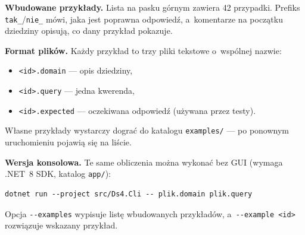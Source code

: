\documentclass[11pt,a4paper]{article}
\begin{document}
\textbf{Wbudowane przykłady.} Lista na pasku górnym zawiera 42 przypadki.
Prefiks \texttt{tak\_}/\texttt{nie\_} mówi, jaka jest poprawna odpowiedź,
a~komentarze na początku dziedziny opisują, co dany przykład pokazuje.

\textbf{Format plików.} Każdy przykład to trzy pliki tekstowe o~wspólnej
nazwie:
\begin{itemize}
  \item \texttt{<id>.domain} --- opis dziedziny,
  \item \texttt{<id>.query} --- jedna kwerenda,
  \item \texttt{<id>.expected} --- oczekiwana odpowiedź (używana przez testy).
\end{itemize}
Własne przykłady wystarczy dograć do katalogu \texttt{examples/} ---
po ponownym uruchomieniu pojawią się na liście.

\textbf{Wersja konsolowa.} Te same obliczenia można wykonać bez GUI
(wymaga .NET~8 SDK, katalog \texttt{app/}):
\begin{verbatim}
dotnet run --project src/Ds4.Cli -- plik.domain plik.query
\end{verbatim}
Opcja \texttt{-{}-examples} wypisuje listę wbudowanych przykładów,
a~\texttt{-{}-example <id>} rozwiązuje wskazany przykład.
\end{document}
